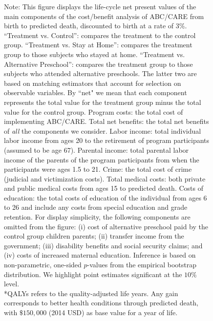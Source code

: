 \begin{figure}
{Note: This figure displays the life-cycle net present values of the main components of the cost/benefit analysis of ABC/CARE from birth to predicted death, discounted to birth at a rate of 3\%. ``Treatment vs. Control'': compares the treatment to the control group. ``Treatment vs. Stay at Home'': compares the treatment group to those subjects who stayed at home. ``Treatment vs. Alternative Preschool'': compares the treatment group to those subjects who attended alternative preschools. The latter two are based on matching estimators that account for selection on observable variables. By ``net" we mean that each component represents the total value for the treatment group minus the total value for the control group. Program costs: the total cost of implementing ABC/CARE. Total net benefits: the total net benefits of \textit{all} the components we consider. Labor income: total individual labor income from ages 20 to the retirement of program participants  (assumed to be age 67). Parental income: total parental labor income of the parents of the program participants from when the participants were ages 1.5 to 21. Crime: the total cost of crime (judicial and victimization costs). Total medical costs: both private and public medical costs from ages 15 to predicted death. Costs of education: the total costs of education of the individual from ages 6 to 26 and include any costs from special education and grade retention. For display simplicity, the following components are omitted from the figure: (i) cost of alternative preschool paid by the control group children parents; (ii) transfer income from the government; (iii) disability benefits and social security claims; and (iv) costs of increased maternal education. Inference is based on non-parametric, one-sided $p$-values from the empirical bootstrap distribution. We highlight point estimates significant at the $10\%$ level.\\
*QALYs refers to the quality-adjusted life years. Any gain corresponds to better health conditions through predicted death, with $\$150,000$ (2014 USD) as base value for a year of life.\\
}
\end{figure}


